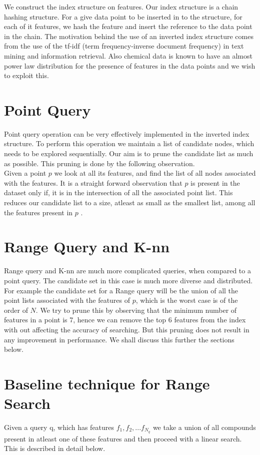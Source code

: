 
We construct the index structure on features. Our index structure is a chain hashing structure. For a give data point to be inserted in to the structure, for each of it features, we hash the feature and insert the reference to the data point in the chain. The motivation behind the use of an inverted index structure comes from the use of the tf-idf (term frequency-inverse document frequency) in text mining and information retrieval. Also chemical data is known to have an almost power law distribution for the presence of features in the data points and we wish to exploit this.

\section{Point Query}

Point query operation can be very effectively 
implemented in the inverted index structure. To perform this operation we maintain a list of candidate nodes, which needs to be explored sequentially. Our aim is to prune the candidate list as much as possible. This pruning is done by the following observation.\\
Given a point $p$ we look at all its features, and find the list of all nodes associated with the features. It is a straight forward observation that $p$ is present in the dataset only if, it is in the intersection of all the associated point list. This reduces our candidate list to a size, atleast as small as the smallest list, among all the features present in $p$ .\\

\section{Range Query and K-nn}
Range query and K-nn are much more complicated queries, when compared to a point query. The candidate set in this case is much more diverse and distributed. For example the candidate set for a Range query will be the union of all the point lists associated with the features of $p$, which is the worst case is of the order of $N$. We try to prune this by observing that the minimum number of features in a point is 7, hence we can remove the top 6 features from the index with out affecting the accuracy of searching. But this pruning does not result in any improvement in performance. We shall discuss this further the sections below.\\

\section{Baseline technique for Range Search}
\label{sec:base}
 Given a query q, which has features $f_1, f_2,...f_{N_q}$ we take a union of all compounds present in atleast one of these features and then proceed with a linear search. This is described in detail below.

